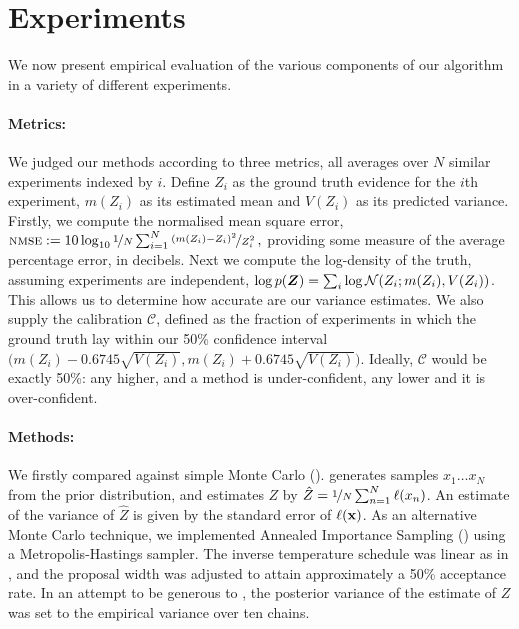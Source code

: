 \documentclass{article}
\begin{document}
\section{Experiments}
\label{sec:experiments}

We now present empirical evaluation of the various components of our algorithm in a variety of different experiments.

\paragraph{Metrics:} We judged our methods according to three metrics, all averages over $N$ similar experiments indexed by $i$. Define $Z_i$ as the ground truth evidence for the $i$th experiment, $m(Z_i)$ as its estimated mean  and $V(Z_i)$  as its predicted variance. Firstly, we compute the normalised mean square error,
$
\acro{nmse} \deq 10 \log_{10} \nicefrac{1}{N} \sum_{i=1}^{N} \nicefrac{(m(Z_i) - Z_i)^2}{Z_i^2}\,,
$
providing some measure of the average percentage error, in decibels. Next we compute the log-density of the truth, assuming experiments are independent,
$
\log p(\vect{Z}) = \sum_i \log \N{Z_i}{m(Z_i)}{V(Z_i)}
$. This allows us to determine how accurate are our variance estimates. We also supply the calibration $\mathcal{C}$, defined as the fraction of experiments in which the ground truth lay within our 50\% confidence interval $\bigl(m(Z_i) - 0.6745 \sqrt{V(Z_i)}, m(Z_i) + 0.6745 \sqrt{V(Z_i)}\bigr)$. Ideally, $\mathcal{C}$ would be exactly 50\%: any higher, and a method is under-confident, any lower and it is over-confident. 

\paragraph{Methods:} We firstly compared against simple Monte Carlo ().  generates samples $x_1 \dots x_N$ from the prior distribution, and estimates $Z$ by $\hat{Z} = \nicefrac{1}{N} \sum_{n=1}^{N} \lfn(x_n)$.  An estimate of the variance of $\hat{Z}$ is given by the standard error of $\lfn({\bf x})$. As an alternative Monte Carlo technique, we implemented Annealed Importance Sampling () using a Metropolis-Hastings sampler.  The inverse temperature schedule was linear as in \citet{BZMonteCarlo}, and the proposal width was adjusted to attain approximately a 50\% acceptance rate.  In an attempt to be generous to , the posterior variance of the  estimate of $Z$ was set to the empirical variance over ten chains.  
\end{document}
